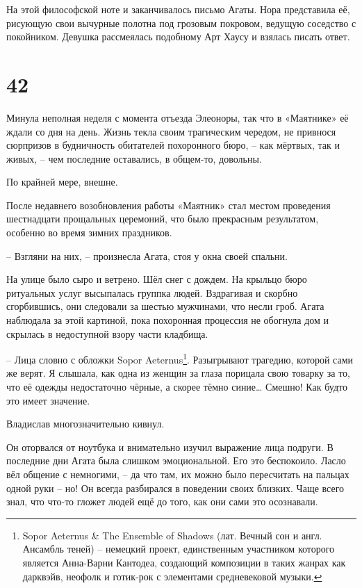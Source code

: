 \documentclass[
  a5paperpaper,
  DIV=11,
  numbers=noendperiod]{scrreprt}
\begin{document}
На этой философской ноте и заканчивалось письмо Агаты. Нора представила
её, рисующую свои вычурные полотна под грозовым покровом, ведущую
соседство с покойником. Девушка рассмеялась подобному Арт Хаусу и
взялась писать ответ.

\section*{42}\label{42}


Минула неполная неделя с момента отъезда Элеоноры, так что в «Маятнике»
её ждали со дня на день. Жизнь текла своим трагическим чередом, не
привнося сюрпризов в будничность обитателей похоронного бюро, -- как
мёртвых, так и живых, -- чем последние оставались, в общем-то, довольны.

По крайней мере, внешне.

После недавнего возобновления работы «Маятник» стал местом проведения
шестнадцати прощальных церемоний, что было прекрасным результатом,
особенно во время зимних праздников.

-- Взгляни на них, -- произнесла Агата, стоя у окна своей спальни.

На улице было сыро и ветрено. Шёл снег с дождем. На крыльцо бюро
ритуальных услуг высыпалась группка людей. Вздрагивая и скорбно
сгорбившись, они следовали за шестью мужчинами, что несли гроб. Агата
наблюдала за этой картиной, пока похоронная процессия не обогнула дом и
скрылась в недоступной взору части кладбища.

-- Лица словно с обложки Sopor Aeternus\footnote{Sopor Aeternus \& The
  Ensemble of Shadows (лат. Вечный сон и англ. Ансамбль теней) --
  немецкий проект, единственным участником которого является Анна-Варни
  Кантодеа, создающий композиции в таких жанрах как дарквэйв, неофолк и
  готик-рок с элементами средневековой музыки.}. Разыгрывают трагедию,
которой сами же верят. Я слышала, как одна из женщин за глаза порицала
свою товарку за то, что её одежды недостаточно чёрные, а скорее тёмно
синие\ldots{} Смешно! Как будто это имеет значение.

Владислав многозначительно кивнул.

Он оторвался от ноутбука и внимательно изучил выражение лица подруги. В
последние дни Агата была слишком эмоциональной. Его это беспокоило.
Ласло вёл общение с немногими, -- да что там, их можно было пересчитать
на пальцах одной руки -- но! Он всегда разбирался в поведении своих
близких. Чаще всего знал, что что-то гложет людей ещё до того, как они
сами это осознавали.
\end{document}
